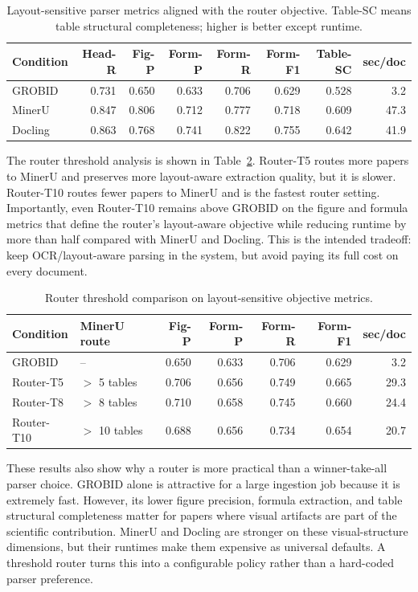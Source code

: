 \documentclass[10pt]{article}
\begin{document}
\begin{table}[t]
\centering
\small
\caption{Layout-sensitive parser metrics aligned with the router objective. Table-SC means table structural completeness; higher is better except runtime.}
\label{tab:parser-summary}
\begin{tabular}{lrrrrrrr}
\toprule
Condition & Head-R & Fig-P & Form-P & Form-R & Form-F1 & Table-SC & sec/doc \\
\midrule
GROBID & 0.731 & 0.650 & 0.633 & 0.706 & 0.629 & 0.528 & 3.2 \\
MinerU & 0.847 & 0.806 & 0.712 & 0.777 & 0.718 & 0.609 & 47.3 \\
Docling & 0.863 & 0.768 & 0.741 & 0.822 & 0.755 & 0.642 & 41.9 \\
\bottomrule
\end{tabular}
\end{table}

The router threshold analysis is shown in Table~\ref{tab:router}. Router-T5 routes more papers to MinerU and preserves more layout-aware extraction quality, but it is slower. Router-T10 routes fewer papers to MinerU and is the fastest router setting. Importantly, even Router-T10 remains above GROBID on the figure and formula metrics that define the router's layout-aware objective while reducing runtime by more than half compared with MinerU and Docling. This is the intended tradeoff: keep OCR/layout-aware parsing in the system, but avoid paying its full cost on every document.

\begin{table}[t]
\centering
\small
\caption{Router threshold comparison on layout-sensitive objective metrics.}
\label{tab:router}
\begin{tabular}{llrrrrr}
\toprule
Condition & MinerU route & Fig-P & Form-P & Form-R & Form-F1 & sec/doc \\
\midrule
GROBID & -- & 0.650 & 0.633 & 0.706 & 0.629 & 3.2 \\
Router-T5 & $>$ 5 tables & 0.706 & 0.656 & 0.749 & 0.665 & 29.3 \\
Router-T8 & $>$ 8 tables & 0.710 & 0.658 & 0.745 & 0.660 & 24.4 \\
Router-T10 & $>$ 10 tables & 0.688 & 0.656 & 0.734 & 0.654 & 20.7 \\
\bottomrule
\end{tabular}
\end{table}

These results also show why a router is more practical than a winner-take-all parser choice. GROBID alone is attractive for a large ingestion job because it is extremely fast. However, its lower figure precision, formula extraction, and table structural completeness matter for papers where visual artifacts are part of the scientific contribution. MinerU and Docling are stronger on these visual-structure dimensions, but their runtimes make them expensive as universal defaults. A threshold router turns this into a configurable policy rather than a hard-coded parser preference.
\end{document}
